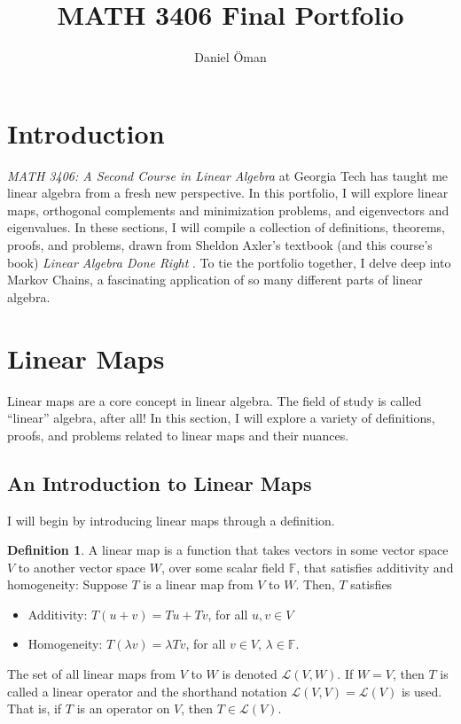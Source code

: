 \documentclass{article}
\title{MATH 3406 Final Portfolio}
\author{Daniel Öman}
\renewcommand{\L}{\mathcal{L}}
\newcommand{\F}{\mathbb{F}}
\theoremstyle{definition}
\newtheorem{definition}{Definition}
\begin{document}
\begin{titlepage}
    \maketitle
    \tableofcontents
    \thispagestyle{empty}
\end{titlepage}

\section{Introduction}

\textit{MATH 3406: A Second Course in Linear Algebra} at Georgia Tech has taught me linear algebra from a fresh new perspective. In this portfolio, I will explore linear maps, orthogonal complements and minimization problems, and eigenvectors and eigenvalues. In these sections, I will compile a collection of definitions, theorems, proofs, and problems, drawn from Sheldon Axler's textbook (and this course's book) \textit{Linear Algebra Done Right} \cite{axler_2017_linear}. To tie the portfolio together, I delve deep into Markov Chains, a fascinating application of so many different parts of linear algebra.

\section{Linear Maps}

Linear maps are a core concept in linear algebra. The field of study is called ``linear'' algebra, after all! In this section, I will explore a variety of definitions, proofs, and problems related to linear maps and their nuances. 

\subsection{An Introduction to Linear Maps}

I will begin by introducing linear maps through a definition.

\begin{definition}
A linear map is a function that takes vectors in some vector space $V$ to another vector space $W$, over some scalar field $\F$, that satisfies additivity and homogeneity: Suppose $T$ is a linear map from $V$ to $W$. Then, $T$ satisfies
\begin{itemize}
    \item Additivity: $T(u + v) = Tu + Tv$, for all $u, v \in V$
    \item Homogeneity: $T(\lambda v) = \lambda Tv$, for all $v \in V$, $\lambda \in \F$.
\end{itemize}
\end{definition}
The set of all linear maps from $V$ to $W$ is denoted $\L(V, W)$. If $W = V$, then $T$ is called a linear operator and the shorthand notation $\L(V, V) = \L(V)$ is used. That is, if $T$ is an operator on $V$, then $T \in \L(V)$. 
\end{document}
